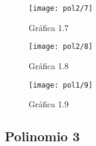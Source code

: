 \documentclass[6pt]{article}
\begin{document}
\begin{figure}[htpb]
	\centering
	\texttt{[image: pol2/7]}
	\caption{Gráfica 1.7}
\end{figure}

\begin{figure}[htpb]
	\centering
	\texttt{[image: pol2/8]}
	\caption{Gráfica 1.8}
\end{figure}

\begin{figure}[htpb]
	\centering
	\texttt{[image: pol1/9]}
	\caption{Gráfica 1.9}
\end{figure}
\newpage
\subsection{Polinomio 3}
\end{document}
